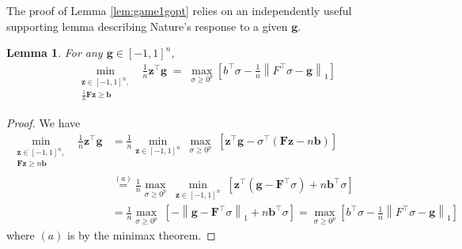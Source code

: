\documentclass{colt2015} %
\newtheorem{lem}[thm]{Lemma}
\newcommand{\vF}{\mathbf{F}}
\newcommand{\vb}{\mathbf{b}}
\newcommand{\vg}{\mathbf{g}}
\newcommand{\vz}{\mathbf{z}}
\newcommand{\vnorm}[1]{\left\lVert#1\right\rVert} %
\newcommand{\lrb}[1]{\left[#1\right]}
\begin{document}
The proof of Lemma \ref{lem:game1gopt} relies on 
an independently useful supporting lemma describing Nature's response to a given $\vg$.
\begin{lem}
\label{lem:gamegeng}
For any $\vg \in [-1,1]^n$,
\begin{align*}
\min_{\substack{ \vz \in [-1,1]^n , \\ \frac{1}{n} \vF \vz \geq \vb }} \;\;\frac{1}{n} \vz^\top \vg 
\;=\; \max_{\sigma \geq 0^p} \left[ b^\top \sigma - \frac{1}{n} \vnorm{F^\top \sigma - \vg}_1 \right]
\end{align*}
\end{lem}
\begin{proof}
We have
\begin{align}
\label{eq:gameinnerdual}
\displaystyle \min_{\substack{ \vz \in [-1,1]^n , \\ \vF \vz \geq n \vb }} \;\; \frac{1}{n} \vz^\top \vg 
&= \frac{1}{n} \min_{\vz \in [-1,1]^n} \; \max_{\sigma \geq 0^p} \;  \lrb{ \vz^\top \vg - \sigma^\top (\vF \vz - n \vb) } \nonumber \\
&\stackrel{(a)}{=} \frac{1}{n} \max_{\sigma \geq 0^p} \; \min_{\vz \in [-1,1]^n} \; \lrb{ \vz^\top (\vg - \vF^\top \sigma) + n \vb^\top \sigma } \nonumber \\
&= \frac{1}{n} \max_{\sigma \geq 0^p} \; \lrb{ - \vnorm{\vg - \vF^\top \sigma}_1 + n \vb^\top \sigma } 
= \max_{\sigma \geq 0^p} \left[ b^\top \sigma - \frac{1}{n} \vnorm{F^\top \sigma - \vg}_1 \right]
\end{align}
where $(a)$ is by the minimax theorem. 
\end{proof}
\end{document}
